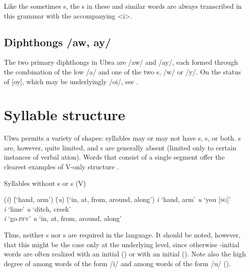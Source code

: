 Like the sometimes s, the s in these and similar words are always transcribed in this grammar with the accompanying  <ï>.


\subsection{Diphthongs /aw, ay/}\label{sec:2.2.2}


The two primary diphthongs in Ulwa are /aw/ and /ay/, each formed through the combination of the  low  /a/ and one of the two s, /w/ or /y/. On the status of [oy], which may be underlyingly /oi/, see .


\section{Syllable structure}\label{sec:2.3}


Ulwa permits a variety of  shapes: syllables may or may not have s, s, or both. s are, however, quite limited, and s are generally absent (limited only to certain instances of verbal ation). Words that consist of a single  segment offer the clearest examples of V-only  structure .

\ea%
    \label{ex:phon:55}
          Syllables without s or s (V)\\
\begin{tabbing}
{(\textit{i})} \= {(‘hand, arm’)} \= {(\textit{u})} \= {(‘in, at, from, around, along’)}\kill
{\textit{i}} \> {‘hand, arm’} \> {\textit{u}} \> {‘you [\textsc{sg}]’}\\
{\textit{i}} \> {‘lime’} \> {\textit{u}} \> {‘ditch, creek’}\\
{\textit{i}} \> {‘go.\textsc{pfv}’} \> {\textit{u}} \> {‘in, at, from, around, along’}
\end{tabbing}
\z

Thus, neither s nor s are required in the language. It should be noted, however, that this might be the case only at the underlying level, since otherwise -initial words are often realized with an initial  () or with an initial    (). Note also the high degree of  among words of the form /i/ and among words of the form /u/ ().

